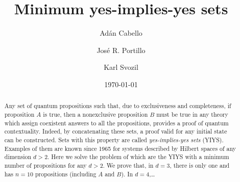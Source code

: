 \documentclass[twocolumn,aps,pra,showpacs]{revtex4-1}
\begin{document}

\title{Minimum yes-implies-yes sets}


\author{Ad\'an Cabello}

\author{Jos\'{e} R. Portillo}

\author{Karl Svozil}


\date{\today}



\begin{abstract}
Any set of quantum propositions such that, due to exclusiveness
and completeness, if proposition $A$ is true, then a
nonexclusive proposition $B$ must be true in any theory which
assign coexistent answers to all the propositions, provides a
proof of quantum contextuality. Indeed, by concatenating these
sets, a proof valid for any initial state can be constructed.
Sets with this property are called {\em yes-implies-yes sets}
(YIYS). Examples of them are known since 1965 for systems
described by Hilbert spaces of any dimension $d>2$. Here we
solve the problem of which are the YIYS with a minimum number
of propositions for any $d>2$. We prove that, in $d=3$, there
is only one and has $n=10$ propositions (including $A$ and
$B$). In $d=4$,\ldots
\end{abstract}




\maketitle
\end{document}
